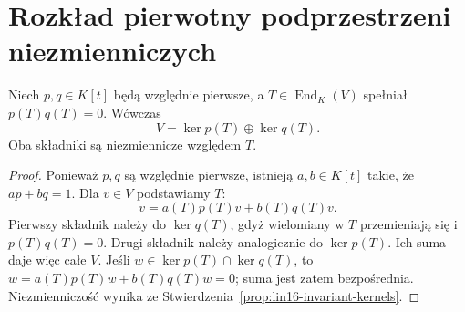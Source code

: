 \section{Rozkład pierwotny podprzestrzeni niezmienniczych}
\label{sec:lin16-primary}

\begin{lemat}
\label{lem:lin16-bezout-kernels}
Niech \(p,q\in K[t]\) będą względnie pierwsze,
a \(T\in\operatorname{End}_K(V)\)
spełniał \(p(T)q(T)=0\).
Wówczas
\[
 V=\ker p(T)\oplus\ker q(T).
\]
Oba składniki są niezmiennicze względem \(T\).
\end{lemat}
\begin{proof}
Ponieważ \(p,q\) są względnie pierwsze,
istnieją \(a,b\in K[t]\) takie, że
\(ap+bq=1\).
Dla \(v\in V\) podstawiamy \(T\):
\[
 v=a(T)p(T)v+b(T)q(T)v.
\]
Pierwszy składnik należy do \(\ker q(T)\),
gdyż wielomiany w \(T\) przemieniają się
i \(p(T)q(T)=0\).
Drugi składnik należy analogicznie
do \(\ker p(T)\).
Ich suma daje więc całe \(V\).
Jeśli \(w\in\ker p(T)\cap\ker q(T)\), to
\(w=a(T)p(T)w+b(T)q(T)w=0\);
suma jest zatem bezpośrednia.
Niezmienniczość wynika ze
Stwierdzenia~\ref{prop:lin16-invariant-kernels}.
\end{proof}

